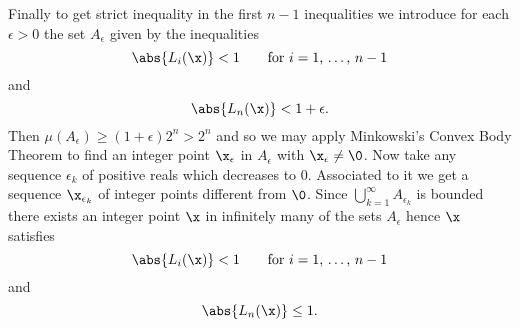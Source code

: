 Finally to get strict inequality in the first $n-1$ inequalities we introduce for each $\epsilon>0$ the set $A_\epsilon$ given by the inequalities
\[ \abs{L_i(\x)}<1 \qquad\text{for $i=1$, $\dotsc$, $n-1$} \]
and
\[ \abs{L_n(\x)}<1+\epsilon . \]
Then $\mu(A_\epsilon)\geq(1+\epsilon)2^n>2^n$ and so we may apply Minkowski's Convex Body Theorem to find an integer point $\x_\epsilon$ in $A_\epsilon$ with $\x_\epsilon\neq\0$.  Now take any sequence $\epsilon_k$ of positive reals which decreases to $0$.  Associated to it we get a sequence $\x_{\epsilon_k}$ of integer points different from $\0$.  Since $\bigcup_{k=1}^\infty A_{\epsilon_k}$ is bounded there exists an integer point $\x$ in infinitely many of the sets $A_\epsilon$ hence $\x$ satisfies
\[ \abs{L_i(\x)}<1 \qquad\text{for $i=1$, $\dotsc$, $n-1$} \]
and
\[ \abs{L_n(\x)}\leq1 . \]
\vspace{-\baselineskip}